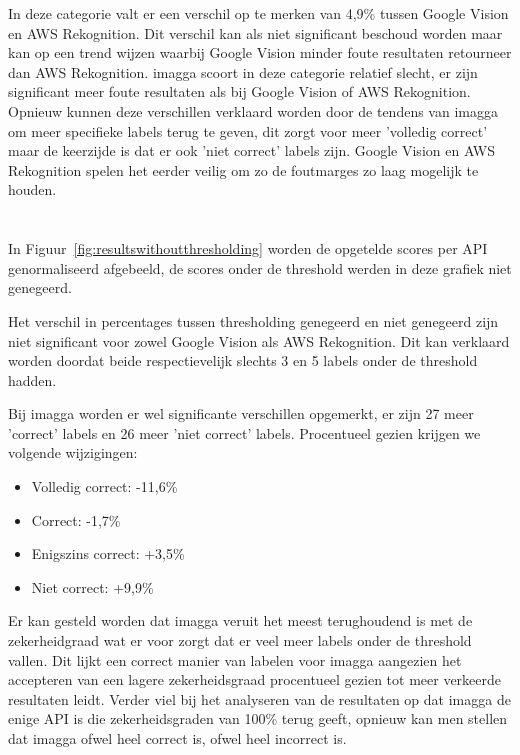 In deze categorie valt er een verschil op te merken van 4,9\% tussen Google Vision en AWS Rekognition. Dit verschil kan als niet significant beschoud worden maar kan op een trend wijzen waarbij Google Vision minder foute resultaten retourneer dan AWS Rekognition. imagga scoort in deze categorie relatief slecht, er zijn significant meer foute resultaten als bij Google Vision of AWS Rekognition. Opnieuw kunnen deze verschillen verklaard worden door de tendens van imagga om meer specifieke labels terug te geven, dit zorgt voor meer 'volledig correct' maar de keerzijde is dat er ook 'niet correct' labels zijn. Google Vision en AWS Rekognition spelen het eerder veilig om zo de foutmarges zo laag mogelijk te houden.

\section{}
\label{sec:resultaten-zonder-thresholding}
In Figuur~\ref{fig:resultswithoutthresholding} worden de opgetelde scores per API genormaliseerd afgebeeld, de scores onder de threshold werden in deze grafiek niet genegeerd.

Het verschil in percentages tussen thresholding genegeerd en niet genegeerd zijn niet significant voor zowel Google Vision als AWS Rekognition. Dit kan verklaard worden doordat beide respectievelijk slechts 3 en 5 labels onder de threshold hadden.

Bij imagga worden er wel significante verschillen opgemerkt, er zijn 27 meer 'correct' labels en 26 meer 'niet correct' labels. Procentueel gezien krijgen we volgende wijzigingen:
\begin{itemize}
    \item Volledig correct: -11,6\%
    \item Correct: -1,7\%
    \item Enigszins correct: +3,5\%
    \item Niet correct: +9,9\%
\end{itemize}

Er kan gesteld worden dat imagga veruit het meest terughoudend is met de zekerheidgraad wat er voor zorgt dat er veel meer labels onder de threshold vallen. Dit lijkt een correct manier van labelen voor imagga aangezien het accepteren van een lagere zekerheidsgraad procentueel gezien tot meer verkeerde resultaten leidt. Verder viel bij het analyseren van de resultaten op dat imagga de enige API is die zekerheidsgraden van 100\% terug geeft, opnieuw kan men stellen dat imagga ofwel heel correct is, ofwel heel incorrect is.

